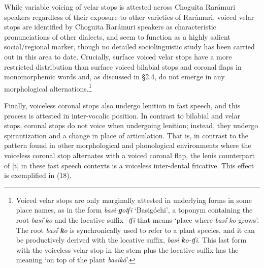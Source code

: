 While variable voicing of velar stops is attested across Choguita Rarámuri speakers regardless of their exposure to other varieties of Rarámuri, voiced velar stops are identified by Choguita Rarámuri speakers as characteristic pronunciations of other dialects, and seem to function as a highly salient social/regional marker, though no detailed sociolinguistic study has been carried out in this area to date. Crucially, surface voiced velar stops have a more restricted distribution than surface voiced bilabial stops and coronal flaps in monomorphemic words and, as discussed in §2.4, do not emerge in any morphological alternations.\footnote{Voiced velar stops are only marginally attested in underlying forms in some place names, as in the form \textit{basiˈ}\textbf{\textit{g}}\textit{otʃi} ‘Basigóchi’, a toponym containing the root \textit{basiˈko} and the locative suffix \textit{{}-tʃi} that means ‘place where \textit{basiˈko} grows’. The root \textit{basiˈ}\textbf{\textit{k}}\textit{o} is synchronically used to refer to a plant species, and it can be productively derived with the locative suffix, \textit{basiˈ}\textbf{\textit{k}}\textit{o-tʃi}. This last form with the voiceless velar stop in the stem plus the locative suffix has the meaning ‘on top of the plant \textit{basikó}’.}

Finally, voiceless coronal stops also undergo lenition in fast speech, and this process is attested in inter-vocalic position. In contrast to bilabial and velar stops, coronal stops do not voice when undergoing lenition; instead, they undergo spirantization and a change in place of articulation. That is, in contrast to the pattern found in other morphological and phonological environments where the voiceless coronal stop alternates with a voiced coronal flap, the lenis counterpart of [t] in these fast speech contexts is a voiceless inter-dental fricative. This effect is exemplified in (18).





